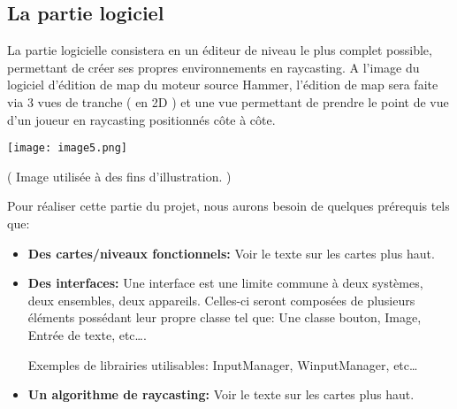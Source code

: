 \documentclass[french, 12pt]{article}
\begin{document}
    \color{black}\begin{flushleft}
    
        \subsection{La partie logiciel}
        \vspace*{1mm}

        La partie logicielle consistera en un éditeur de niveau le plus complet possible, permettant de créer ses propres environnements en raycasting. A l’image du logiciel d’édition de map du moteur source Hammer, l’édition de map sera faite via 3 vues de tranche ( en 2D ) et une vue permettant de prendre le point de vue d’un joueur en raycasting positionnés côte à côte. \newline

    \end{flushleft}
    \begin{center}
            \texttt{[image: image5.png]}
            
            \tiny\color{gray}( Image utilisée à des fins d’illustration. )
    \end{center}
    \color{black}\begin{flushleft}
        \vspace*{1mm}

        Pour réaliser cette partie du projet, nous aurons besoin de quelques prérequis tels que:
        \newline
        \begin{itemize}
            \item \textbf{Des cartes/niveaux fonctionnels:}
            Voir le texte sur les cartes plus haut.
            
            \item \textbf{Des interfaces:}
            Une interface est une limite commune à deux systèmes, deux ensembles, deux appareils.
            Celles-ci seront composées de plusieurs éléments possédant leur propre classe tel que: Une classe bouton, Image, Entrée de texte, etc….

            Exemples de librairies utilisables: InputManager, WinputManager, etc…
            
            \item \textbf{Un algorithme de raycasting:}
            Voir le texte sur les cartes plus haut.
            
        \end{itemize}

    \end{flushleft}
\end{document}
